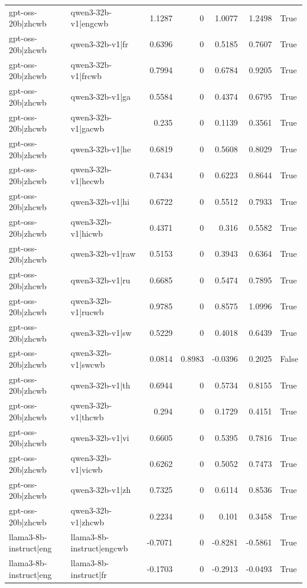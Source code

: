 \begin{table}
\begin{tabular}{l l r r r r l}
gpt-oss-20b|zhcwb & qwen3-32b-v1|engcwb & 1.1287 & 0 & 1.0077 & 1.2498 & True \\
gpt-oss-20b|zhcwb & qwen3-32b-v1|fr & 0.6396 & 0 & 0.5185 & 0.7607 & True \\
gpt-oss-20b|zhcwb & qwen3-32b-v1|frcwb & 0.7994 & 0 & 0.6784 & 0.9205 & True \\
gpt-oss-20b|zhcwb & qwen3-32b-v1|ga & 0.5584 & 0 & 0.4374 & 0.6795 & True \\
gpt-oss-20b|zhcwb & qwen3-32b-v1|gacwb & 0.235 & 0 & 0.1139 & 0.3561 & True \\
gpt-oss-20b|zhcwb & qwen3-32b-v1|he & 0.6819 & 0 & 0.5608 & 0.8029 & True \\
gpt-oss-20b|zhcwb & qwen3-32b-v1|hecwb & 0.7434 & 0 & 0.6223 & 0.8644 & True \\
gpt-oss-20b|zhcwb & qwen3-32b-v1|hi & 0.6722 & 0 & 0.5512 & 0.7933 & True \\
gpt-oss-20b|zhcwb & qwen3-32b-v1|hicwb & 0.4371 & 0 & 0.316 & 0.5582 & True \\
gpt-oss-20b|zhcwb & qwen3-32b-v1|raw & 0.5153 & 0 & 0.3943 & 0.6364 & True \\
gpt-oss-20b|zhcwb & qwen3-32b-v1|ru & 0.6685 & 0 & 0.5474 & 0.7895 & True \\
gpt-oss-20b|zhcwb & qwen3-32b-v1|rucwb & 0.9785 & 0 & 0.8575 & 1.0996 & True \\
gpt-oss-20b|zhcwb & qwen3-32b-v1|sw & 0.5229 & 0 & 0.4018 & 0.6439 & True \\
gpt-oss-20b|zhcwb & qwen3-32b-v1|swcwb & 0.0814 & 0.8983 & -0.0396 & 0.2025 & False \\
gpt-oss-20b|zhcwb & qwen3-32b-v1|th & 0.6944 & 0 & 0.5734 & 0.8155 & True \\
gpt-oss-20b|zhcwb & qwen3-32b-v1|thcwb & 0.294 & 0 & 0.1729 & 0.4151 & True \\
gpt-oss-20b|zhcwb & qwen3-32b-v1|vi & 0.6605 & 0 & 0.5395 & 0.7816 & True \\
gpt-oss-20b|zhcwb & qwen3-32b-v1|vicwb & 0.6262 & 0 & 0.5052 & 0.7473 & True \\
gpt-oss-20b|zhcwb & qwen3-32b-v1|zh & 0.7325 & 0 & 0.6114 & 0.8536 & True \\
gpt-oss-20b|zhcwb & qwen3-32b-v1|zhcwb & 0.2234 & 0 & 0.101 & 0.3458 & True \\
llama3-8b-instruct|eng & llama3-8b-instruct|engcwb & -0.7071 & 0 & -0.8281 & -0.5861 & True \\
llama3-8b-instruct|eng & llama3-8b-instruct|fr & -0.1703 & 0 & -0.2913 & -0.0493 & True \\

\end{tabular}
\end{table}
